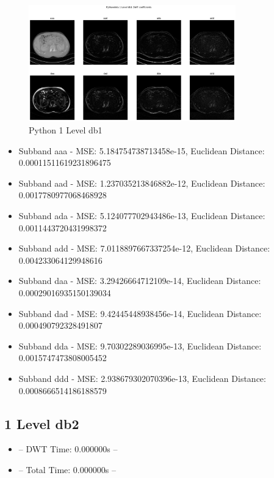 \documentclass{article}
\begin{document}
\begin{figure}[H]
    \centering
    \includegraphics[width=0.8\textwidth]{assets/py-1-db1.png}
    \caption{Python 1 Level db1}
    \label{fig10}
\end{figure}

\begin{itemize}
    \item Subband aaa - MSE: 5.184754738713458e-15, Euclidean Distance: 0.00011511619231896475
    \item Subband aad - MSE: 1.237035213846882e-12, Euclidean Distance: 0.0017780977068468928
    \item Subband ada - MSE: 5.124077702943486e-13, Euclidean Distance: 0.0011443720431998372
    \item Subband add - MSE: 7.0118897667337254e-12, Euclidean Distance: 0.004233064129948616
    \item Subband daa - MSE: 3.29426664712109e-14, Euclidean Distance: 0.00029016935150139034
    \item Subband dad - MSE: 9.42445448938456e-14, Euclidean Distance: 0.000490792328491807
    \item Subband dda - MSE: 9.70302289036995e-13, Euclidean Distance: 0.0015747473808005452
    \item Subband ddd - MSE: 2.938679302070396e-13, Euclidean Distance: 0.0008666514186188579
\end{itemize}

\subsection{1 Level db2}
\begin{itemize}
    \item -- DWT Time: 0.000000s --
    \item -- Total Time: 0.000000s --
\end{itemize}
\end{document}
